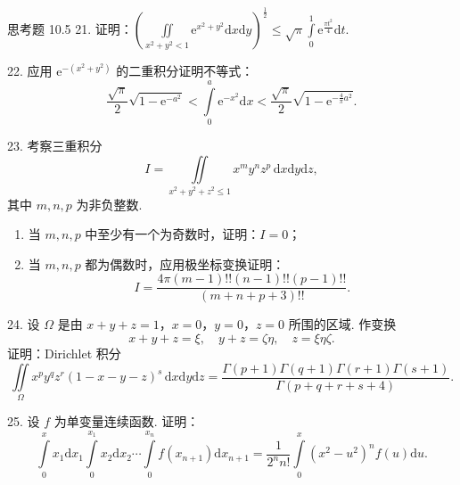 \begin{exblock}{思考题 10.5}
21. 证明：$\left( \iint \limits_{x^2 + y^2 < 1} \mathrm{e}^{x^2 + y^2} \mathrm{d}x \mathrm{d}y \right)^{\frac{1}{2}}
\leqslant \sqrt{\pi} \int \limits_0^1 \mathrm{e}^{\frac{\pi t^2}{4}} \mathrm{d}t$.

22. 应用 $\mathrm{e}^{-(x^2 + y^2)}$ 的二重积分证明不等式：
\[
\frac{\sqrt{\pi}}{2} \sqrt{1 - \mathrm{e}^{-a^2}}
< \int \limits_0^a \mathrm{e}^{-x^2} \mathrm{d}x
< \frac{\sqrt{\pi}}{2} \sqrt{1 - \mathrm{e}^{-\frac{4}{\pi} a^2}}.
\]

23. 考察三重积分
\[
I = \iint \limits_{x^2 + y^2 + z^2 \leqslant 1} x^{m} y^{n} z^{p} \, \mathrm{d}x \mathrm{d}y \mathrm{d}z,
\]
其中 $m, n, p$ 为非负整数.
\begin{enumerate}
  \item 当 $m, n, p$ 中至少有一个为奇数时，证明：$I = 0$；
  \item 当 $m, n, p$ 都为偶数时，应用极坐标变换证明：
  \[
  I = \frac{4\pi (m-1)!! (n-1)!! (p-1)!!}{(m + n + p + 3)!!}.
  \]
\end{enumerate}

24. 设 $\Omega$ 是由 $x + y + z = 1$，$x = 0$，$y = 0$，$z = 0$ 所围的区域. 作变换
\[
x + y + z = \xi, \quad y + z = \zeta \eta, \quad z = \xi \eta \zeta.
\]
证明：Dirichlet 积分
\[
\iint \limits_{\Omega} x^{p} y^{q} z^{r} (1 - x - y - z)^{s} \, \mathrm{d}x \mathrm{d}y \mathrm{d}z
= \frac{\Gamma(p+1) \Gamma(q+1) \Gamma(r+1) \Gamma(s+1)}{\Gamma(p + q + r + s + 4)}.
\]

25. 设 $f$ 为单变量连续函数. 证明：
\[
\int \limits_0^{x} x_1 \mathrm{d}x_1 \int \limits_0^{x_1} x_2 \mathrm{d}x_2 \cdots \int \limits_0^{x_n} f(x_{n+1}) \mathrm{d}x_{n+1}
= \frac{1}{2^{n} n!} \int \limits_0^{x} (x^2 - u^2)^{n} f(u) \mathrm{d}u.
\]
\end{exblock}
